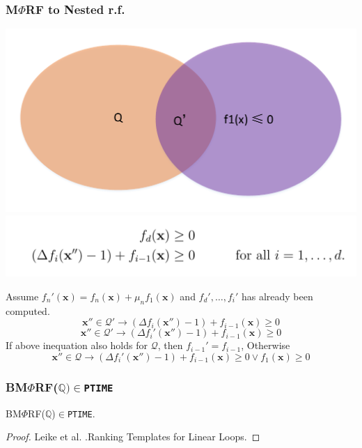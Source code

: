 \documentclass[11pt]{beamer}
\begin{document}
\begin{frame}\frametitle{M$\Phi$RF to Nested r.f.}
\begin{center}
\includegraphics[scale = 0.3]{1.pdf}
\includegraphics[scale = 0.2]{6.PNG}
\end{center}

Assume $f_{n}'(\textbf{x})= f_{n}(\textbf{x}) + \mu_{n}f_1(\textbf{x})$ and $f_d', \ldots, f_{i}'$ has already been computed.
\[\textbf{x}''\in \mathcal{Q}' \rightarrow (\Delta f_i(\textbf{x}'') - 1) + f_{i-1}(\textbf{x}) \ge 0\]
\[\textbf{x}''\in \mathcal{Q}' \rightarrow (\Delta f_i'(\textbf{x}'') - 1) + f_{i-1}(\textbf{x}) \ge 0\]
If above inequation also holds for $\mathcal{Q}$, then $f_{i-1}' = f_{i-1}$, Otherwise
\[\textbf{x}''\in \mathcal{Q} \rightarrow (\Delta f_i'(\textbf{x}'') - 1) + f_{i-1}(\textbf{x}) \ge 0 \vee f_1(\textbf{x}) \ge 0\]


\end{frame}

\begin{frame}\frametitle{BM$\Phi$RF($\mathbb{Q})\in$\texttt{PTIME}}
\begin{theorem}[2]
BM$\Phi$RF($\mathbb{Q}$)$\in$\texttt{PTIME}.



\end{theorem}

\begin{proof}
Leike et al. .Ranking Templates for Linear Loops. 

\end{proof}
\end{frame}
\end{document}
